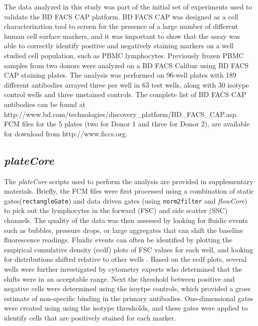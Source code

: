 \documentclass[12pt]{article}
\newcommand{\Robject}[1]{{\texttt{#1}}}
\newcommand{\Rpackage}[1]{{\textit{#1}}}
\begin{document}
The data analyzed in this study was part of the initial set of experiments
used to validate the BD FACS CAP platform. BD FACS CAP was designed as a cell
characterization tool to screen for the presence of a large number of different
human cell surface markers, and it was important to show that the assay was
able to correctly identify positive and negatively staining markers on a well
studied cell population, such as PBMC lymphocytes. Previously
frozen PBMC samples from two donors were analyzed on a BD FACS Calibur using BD
FACS CAP staining plates. The analysis was performed on 96-well plates with 189
different antibodies arrayed three per well in 63 test wells, along with 30
isotype control wells and three unstained controls. The complete list of BD
FACS CAP antibodies can be found at
http://www.bd.com/technologies/discovery\_platform/BD\_FACS\_CAP.asp. FCM files
for the 5 plates (two for Donor 1 and three for Donor 2), are available for
download from http://www.ficcs.org.

\subsection*{\Rpackage{plateCore}}

The \Rpackage{plateCore}
scripts used to perform the analysis are provided in supplementary materials.
Briefly, the FCM files were first processed using a combination of static
gates(\Robject{rectangleGate}) and data driven gates (using
\Robject{norm2filter} and \Rpackage{flowCore}) to pick out the lymphocytes in
the forward (FSC) and side scatter (SSC) channels.  The
quality of the data was then assessed by looking for fluidic events such as
bubbles, pressure drops, or large aggregates that can shift the baseline
fluorescence readings. Fluidic events can often be identified by plotting the
empirical cumulative density (ecdf) plots of FSC values for each well, and
looking for distributions shifted relative to other wells \citep{lemeur2007}.
Based on the ecdf plots, several wells were further investigated by cytometry
experts who determined that the shifts were in an acceptable range. Next the
threshold between positive and negative cells were determined using the isoytpe
controls, which provided a gross estimate of non-specific binding in the
primary antibodies. One-dimensional gates were created using using the isotype
thresholds, and these gates were applied to identify cells that are positively
stained for each marker.
\end{document}

